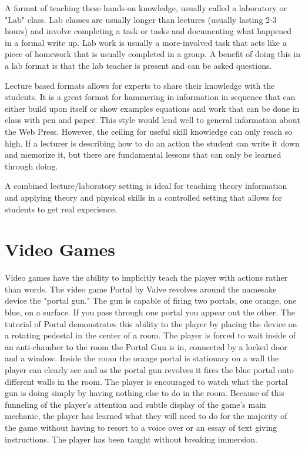 \documentclass[onecolumn, draftclsnofoot,10pt, compsoc]{IEEEtran}
\begin{document}
A format of teaching these hands-on knowledge, usually called a laboratory or "Lab" class. Lab classes are usually longer than lectures (usually lasting 2-3 hours) and involve completing a task or tasks and documenting what happened in a formal write up. Lab work is usually a more-involved task that acts like a piece of homework that is usually completed in a group. A benefit of doing this in a lab format is that the lab teacher is present and can be asked questions.

Lecture based formats allows for experts to share their knowledge with the students. It is a great format for hammering in information in sequence that can either build upon itself or show examples equations and work that can be done in class with pen and paper. This style would lend well to general information about the Web Press. However, the ceiling for useful skill knowledge can only reach so high. If a lecturer is describing how to do an action the student can write it down and memorize it, but there are fundamental lessons that can only be learned through doing. 

A combined lecture/laboratory setting is ideal for teaching theory information and applying theory and physical skills in a controlled setting that allows for students to get real experience.

\section*{Video Games}
Video games have the ability to implicitly teach the player with actions rather than words. The video game Portal by Valve revolves around the namesake device the "portal gun." The gun is capable of firing two portals, one orange, one blue, on a surface. If you pass through one portal you appear out the other. The tutorial of Portal demonstrates this ability to the player by placing the device on a rotating pedestal in the center of a room. The player is forced to wait inside of an anti-chamber to the room the Portal Gun is in, connected by a locked door and a window. Inside the room the orange portal is stationary on a wall the player can clearly see and as the portal gun revolves it fires the blue portal onto different walls in the room. The player is encouraged to watch what the portal gun is doing simply by having nothing else to do in the room. Because of this funneling of the player's attention and subtle display of the game's main mechanic, the player has learned what they will need to do for the majority of the game without having to resort to a voice over or an essay of text giving instructions. The player has been taught without breaking immersion. \cite{portal}
\end{document}
